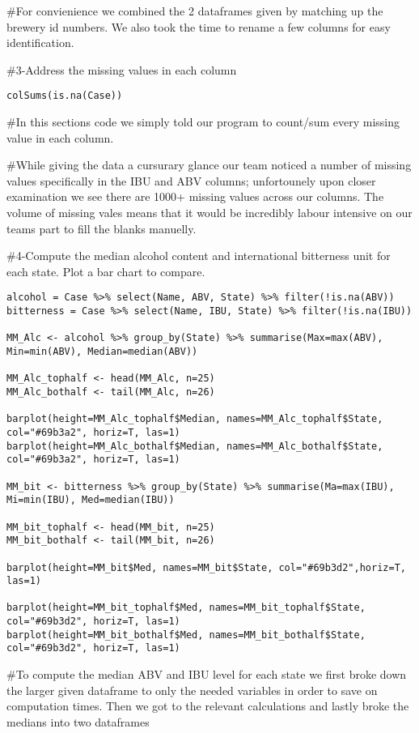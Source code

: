 \documentclass[
]{article}
\begin{document}
\#For convienience we combined the 2 dataframes given by matching up the
brewery id numbers. We also took the time to rename a few columns for
easy identification.

\#3-Address the missing values in each column

\begin{verbatim}
colSums(is.na(Case))
\end{verbatim}

\#In this sections code we simply told our program to count/sum every
missing value in each column.

\#While giving the data a cursurary glance our team noticed a number of
missing values specifically in the IBU and ABV columns; unfortounely
upon closer examination we see there are 1000+ missing values across our
columns. The volume of missing vales means that it would be incredibly
labour intensive on our teams part to fill the blanks manuelly.

\#4-Compute the median alcohol content and international bitterness unit
for each state. Plot a bar chart to compare.

\begin{verbatim}
alcohol = Case %>% select(Name, ABV, State) %>% filter(!is.na(ABV))
bitterness = Case %>% select(Name, IBU, State) %>% filter(!is.na(IBU))

MM_Alc <- alcohol %>% group_by(State) %>% summarise(Max=max(ABV), Min=min(ABV), Median=median(ABV))

MM_Alc_tophalf <- head(MM_Alc, n=25)
MM_Alc_bothalf <- tail(MM_Alc, n=26)

barplot(height=MM_Alc_tophalf$Median, names=MM_Alc_tophalf$State, col="#69b3a2", horiz=T, las=1)
barplot(height=MM_Alc_bothalf$Median, names=MM_Alc_bothalf$State, col="#69b3a2", horiz=T, las=1)
  
MM_bit <- bitterness %>% group_by(State) %>% summarise(Ma=max(IBU), Mi=min(IBU), Med=median(IBU))

MM_bit_tophalf <- head(MM_bit, n=25)
MM_bit_bothalf <- tail(MM_bit, n=26)

barplot(height=MM_bit$Med, names=MM_bit$State, col="#69b3d2",horiz=T, las=1)

barplot(height=MM_bit_tophalf$Med, names=MM_bit_tophalf$State, col="#69b3d2", horiz=T, las=1)
barplot(height=MM_bit_bothalf$Med, names=MM_bit_bothalf$State, col="#69b3d2", horiz=T, las=1)
\end{verbatim}

\#To compute the median ABV and IBU level for each state we first broke
down the larger given dataframe to only the needed variables in order to
save on computation times. Then we got to the relevant calculations and
lastly broke the medians into two dataframes
\end{document}

